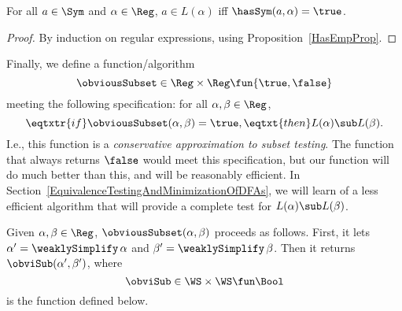 \begin{proposition}
\label{HasSymProp}
For all $a\in\Sym$ and $\alpha\in\Reg$,
$a\in L(\alpha)$ iff $\hasSym(a,\alpha) = \true$.
\end{proposition}

\begin{proof}
By induction on regular expressions, using Proposition~\ref{HasEmpProp}.
\end{proof}

Finally, we define a function/algorithm
%
%
%
\begin{displaymath}
\obviousSubset\in\Reg\times\Reg\fun\{\true,\false\}
\end{displaymath}
meeting the following specification: for all $\alpha,\beta\in\Reg$,
\begin{displaymath}
\eqtxtr{if} \obviousSubset(\alpha,\beta)=\true,
\eqtxt{then} L(\alpha)\sub L(\beta) .
\end{displaymath}
I.e., this function is a \emph{conservative approximation to subset testing}.
%
%
The function that always returns $\false$
would meet this specification, but our function will do much better
than this, and will be reasonably efficient. In
Section~\ref{EquivalenceTestingAndMinimizationOfDFAs},
we will learn of a less efficient algorithm that will provide a complete test
for $L(\alpha)\sub L(\beta)$.

Given $\alpha,\beta\in\Reg$, $\obviousSubset(\alpha,\beta)$ proceeds
as follows.  First, it lets $\alpha'=\weaklySimplify\,\alpha$ and
$\beta'=\weaklySimplify\,\beta$.  Then it returns
$\obviSub(\alpha',\beta')$, where
\begin{displaymath}
\obviSub\in\WS\times\WS\fun\Bool
\end{displaymath}
is the function defined below.

